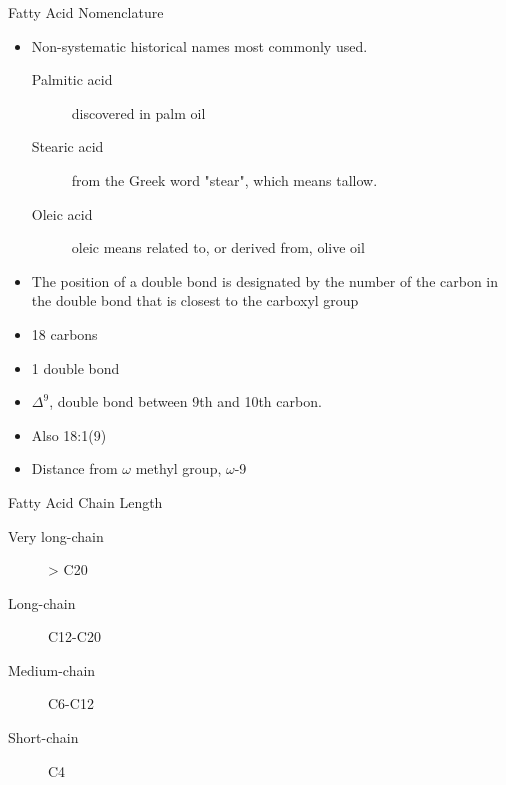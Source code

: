 \documentclass[presentation, smaller]{beamer}
\begin{document}
\begin{frame}[label={sec:orgheadline2}]{Fatty Acid Nomenclature}
\begin{itemize}
\item Non-systematic historical names most commonly used.
\begin{description}
\item[{Palmitic acid}] discovered in palm oil
\item[{Stearic acid}] from the Greek word "stear", which means tallow.
\item[{Oleic acid}] oleic means related to, or derived from, olive oil
\end{description}
\item The position of a double bond is designated by the number of the carbon in the double bond that is closest to the carboxyl group
\end{itemize}



\begin{itemize}
\item 18 carbons
\item 1 double bond
\item \(\Delta^{\text{9}}\), double bond between 9th and 10th carbon.
\item Also 18:1(9)
\item Distance from \(\omega\) methyl group, \(\omega\)-9
\end{itemize}
\end{frame}

\begin{frame}[label={sec:orgheadline3}]{Fatty Acid Chain Length}
\begin{description}
\item[{Very long-chain}] > C20
\item[{Long-chain}] C12-C20
\item[{Medium-chain}] C6-C12
\item[{Short-chain}] C4
\end{description}
\end{frame}
\end{document}
